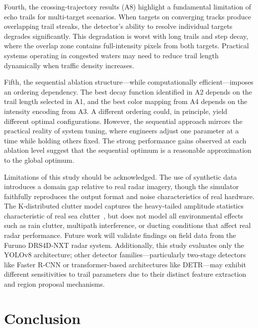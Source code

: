 \documentclass[twocolumn, 10pt]{article}
\begin{document}
Fourth, the crossing-trajectory results (A8) highlight a fundamental limitation of echo trails for multi-target scenarios. When targets on converging tracks produce overlapping trail streaks, the detector's ability to resolve individual targets degrades significantly. This degradation is worst with long trails and step decay, where the overlap zone contains full-intensity pixels from both targets. Practical systems operating in congested waters may need to reduce trail length dynamically when traffic density increases.

Fifth, the sequential ablation structure---while computationally efficient---imposes an ordering dependency. The best decay function identified in A2 depends on the trail length selected in A1, and the best color mapping from A4 depends on the intensity encoding from A3. A different ordering could, in principle, yield different optimal configurations. However, the sequential approach mirrors the practical reality of system tuning, where engineers adjust one parameter at a time while holding others fixed. The strong performance gains observed at each ablation level suggest that the sequential optimum is a reasonable approximation to the global optimum.

Limitations of this study should be acknowledged. The use of synthetic data introduces a domain gap relative to real radar imagery, though the simulator faithfully reproduces the output format and noise characteristics of real hardware. The K-distributed clutter model captures the heavy-tailed amplitude statistics characteristic of real sea clutter~\cite{Ward2013Marine}, but does not model all environmental effects such as rain clutter, multipath interference, or ducting conditions that affect real radar performance. Future work will validate findings on field data from the Furuno DRS4D-NXT radar system. Additionally, this study evaluates only the YOLOv8 architecture; other detector families---particularly two-stage detectors like Faster R-CNN or transformer-based architectures like DETR---may exhibit different sensitivities to trail parameters due to their distinct feature extraction and region proposal mechanisms.


\section{Conclusion}
\end{document}
